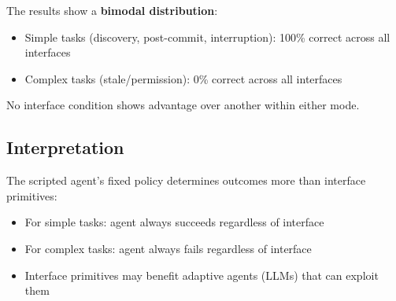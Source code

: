 The results show a \textbf{bimodal distribution}:
\begin{itemize}
    \item Simple tasks (discovery, post-commit, interruption): 100\% correct across all interfaces
    \item Complex tasks (stale/permission): 0\% correct across all interfaces
\end{itemize}

No interface condition shows advantage over another within either mode.

\subsection{Interpretation}

The scripted agent's fixed policy determines outcomes more than interface primitives:
\begin{itemize}
    \item For simple tasks: agent always succeeds regardless of interface
    \item For complex tasks: agent always fails regardless of interface
    \item Interface primitives may benefit adaptive agents (LLMs) that can exploit them
\end{itemize}

